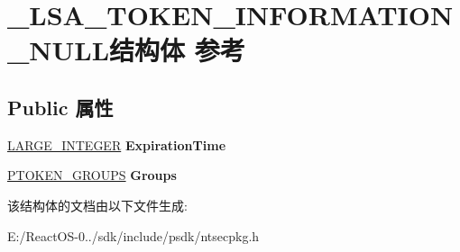 \hypertarget{struct___l_s_a___t_o_k_e_n___i_n_f_o_r_m_a_t_i_o_n___n_u_l_l}{}\section{\+\_\+\+L\+S\+A\+\_\+\+T\+O\+K\+E\+N\+\_\+\+I\+N\+F\+O\+R\+M\+A\+T\+I\+O\+N\+\_\+\+N\+U\+L\+L结构体 参考}
\label{struct___l_s_a___t_o_k_e_n___i_n_f_o_r_m_a_t_i_o_n___n_u_l_l}
\subsection*{Public 属性}
\begin{DoxyCompactItemize}
\item 
\mbox{\label{struct___l_s_a___t_o_k_e_n___i_n_f_o_r_m_a_t_i_o_n___n_u_l_l_af772e21dbbaaf209dd0894a77c66238b}} 
\hyperlink{union___l_a_r_g_e___i_n_t_e_g_e_r}{L\+A\+R\+G\+E\+\_\+\+I\+N\+T\+E\+G\+ER} {\bfseries Expiration\+Time}
\item 
\mbox{\label{struct___l_s_a___t_o_k_e_n___i_n_f_o_r_m_a_t_i_o_n___n_u_l_l_a1fde35f5bbd4adcb3049d6a66bbdd4c8}} 
\hyperlink{struct___t_o_k_e_n___g_r_o_u_p_s}{P\+T\+O\+K\+E\+N\+\_\+\+G\+R\+O\+U\+PS} {\bfseries Groups}
\end{DoxyCompactItemize}


该结构体的文档由以下文件生成\+:\begin{DoxyCompactItemize}
\item 
E\+:/\+React\+O\+S-\/0../sdk/include/psdk/ntsecpkg.\+h\end{DoxyCompactItemize}
